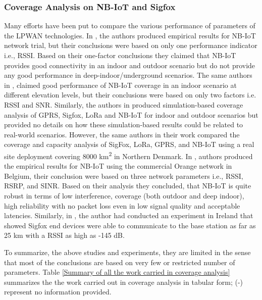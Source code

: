 \documentclass[12pt]{article}
\begin{document}
\subsubsection{Coverage Analysis on NB-IoT and Sigfox}

Many efforts have been put to compare the various performance of parameters of the LPWAN technologies. In \cite{malik2019nb}, the authors produced empirical results for NB-IoT network trial, but their conclusions were based on only one performance indicator i.e., RSSI. Based on their one-factor conclusions they claimed that NB-IoT provides good connectivity in an indoor and outdoor scenario but do not provide any good performance in deep-indoor/underground scenarios. The same authors in \cite{khan2019dorm}, claimed good performance of NB-IoT coverage in an indoor scenario at different elevation levels, but their conclusions were based on only two factors i.e. RSSI and SNR. Similarly, the authors in \cite{lauridsen2017coverage} produced simulation-based coverage analysis of GPRS, Sigfox, LoRa and NB-IoT for indoor and outdoor scenarios but provided no details on how these simulation-based results could be related to real-world scenarios. However, the same authors in their work \cite{vejlgaard2017coverage} compared the coverage and capacity analysis of SigFox, LoRa, GPRS, and NB-IoT  using a real site deployment covering 8000 km\textsuperscript{2} in Northern Denmark. In \cite{basu2019experimental}, authors produced the empirical results for NB-IoT using the commercial Orange \cite{orange} network in Belgium, their conclusion were based on three network parameters i.e., RSSI, RSRP, and SINR. Based on their analysis they concluded, that NB-IoT is quite robust in terms of low interference, coverage (both outdoor and deep indoor), high reliability with no packet loss even in low signal quality and acceptable latencies. Similarly, in \cite{nolan2016evaluation}, the author had conducted an experiment in Ireland that showed Sigfox end devices were able to communicate to the base station as far as 25 km with a RSSI as high as -145 dB.\par

To summarize, the above studies and experiments, they are limited in the sense that most of the conclusions are based on very few or restricted number of parameters. Table \ref{Summary of all the work carried in coverage analysis} summarizes the the work carried out in coverage analysis in tabular form; (-) represent no information provided.
\end{document}
